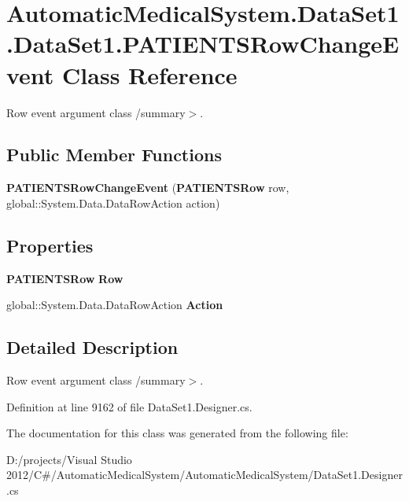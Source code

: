 \section{AutomaticMedicalSystem.DataSet1.DataSet1.PATIENTSRowChangeEvent Class Reference}
\label{class_automatic_medical_system_1_1_data_set1_1_1_p_a_t_i_e_n_t_s_row_change_event}
Row event argument class /summary$>$.  


\subsection*{Public Member Functions}
\begin{CompactItemize}
\item 
\textbf{PATIENTSRowChangeEvent} ({\bf PATIENTSRow} row, global::System.Data.DataRowAction action)\label{class_automatic_medical_system_1_1_data_set1_1_1_p_a_t_i_e_n_t_s_row_change_event_dc56b57fcdbe09ce8c4a86546c0a90d8}

\end{CompactItemize}
\subsection*{Properties}
\begin{CompactItemize}
\item 
{\bf PATIENTSRow} \textbf{Row}\hspace{0.3cm}{\tt  [get]}\label{class_automatic_medical_system_1_1_data_set1_1_1_p_a_t_i_e_n_t_s_row_change_event_9d4d449a01cb99051a2d7720183b0b97}

\item 
global::System.Data.DataRowAction \textbf{Action}\hspace{0.3cm}{\tt  [get]}\label{class_automatic_medical_system_1_1_data_set1_1_1_p_a_t_i_e_n_t_s_row_change_event_b653122d0d54aa443c3b85dbdd32c8bb}

\end{CompactItemize}


\subsection{Detailed Description}
Row event argument class /summary$>$. 

Definition at line 9162 of file DataSet1.Designer.cs.

The documentation for this class was generated from the following file:\begin{CompactItemize}
\item 
D:/projects/Visual Studio 2012/C\#/AutomaticMedicalSystem/AutomaticMedicalSystem/DataSet1.Designer.cs\end{CompactItemize}
